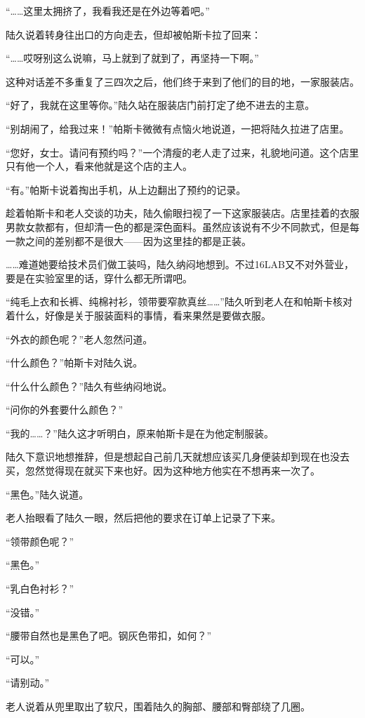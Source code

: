 “……这里太拥挤了，我看我还是在外边等着吧。”

陆久说着转身往出口的方向走去，但却被帕斯卡拉了回来：

“……哎呀别这么说嘛，马上就到了就到了，再坚持一下啊。”

这种对话差不多重复了三四次之后，他们终于来到了他们的目的地，一家服装店。

“好了，我就在这里等你。”陆久站在服装店门前打定了绝不进去的主意。

“别胡闹了，给我过来！”帕斯卡微微有点恼火地说道，一把将陆久拉进了店里。

“您好，女士。请问有预约吗？”一个清瘦的老人走了过来，礼貌地问道。这个店里只有他一个人，看来他就是这个店的主人。

“有。”帕斯卡说着掏出手机，从上边翻出了预约的记录。

趁着帕斯卡和老人交谈的功夫，陆久偷眼扫视了一下这家服装店。店里挂着的衣服男款女款都有，但却清一色的都是深色面料。虽然应该说有不少不同款式，但是每一款之间的差别都不是很大——因为这里挂的都是正装。

……难道她要给技术员们做工装吗，陆久纳闷地想到。不过16LAB又不对外营业，要是在实验室里的话，穿什么都无所谓吧。

“纯毛上衣和长裤、纯棉衬衫，领带要窄款真丝……”陆久听到老人在和帕斯卡核对着什么，好像是关于服装面料的事情，看来果然是要做衣服。

“外衣的颜色呢？”老人忽然问道。

“什么颜色？”帕斯卡对陆久说。

“什么什么颜色？”陆久有些纳闷地说。

“问你的外套要什么颜色？”

“我的……？”陆久这才听明白，原来帕斯卡是在为他定制服装。

陆久下意识地想推辞，但是想起自己前几天就想应该买几身便装却到现在也没去买，忽然觉得现在就买下来也好。因为这种地方他实在不想再来一次了。

“黑色。”陆久说道。

老人抬眼看了陆久一眼，然后把他的要求在订单上记录了下来。

“领带颜色呢？”

“黑色。”

“乳白色衬衫？”

“没错。”

“腰带自然也是黑色了吧。钢灰色带扣，如何？”

“可以。”

“请别动。”

老人说着从兜里取出了软尺，围着陆久的胸部、腰部和臀部绕了几圈。


